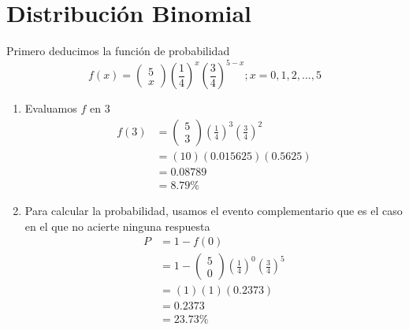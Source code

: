 \documentclass[12pt, letterpaper]{article}
\begin{document}
\section{Distribución Binomial}
Primero deducimos la función de probabilidad
\begin{equation*}
    f(x) = 
    \left(
        \begin{matrix}
            5 \\
            x
        \end{matrix}
    \right)
    \left(\frac{1}{4}\right)^{x}\left(\frac{3}{4}\right)^{5-x};x=0, 1, 2, ..., 5
\end{equation*}
\begin{enumerate}
    \item Evaluamos $f$ en 3
    \begin{equation*}
        \begin{aligned}
            f(3)
            & = 
            \left(
                \begin{matrix}
                    5 \\
                    3
                \end{matrix}
            \right)
            \left(\frac{1}{4}\right)^{3}\left(\frac{3}{4}\right)^{2} \\
            & = (10)(0.015625)(0.5625) \\
            & = 0.08789 \\
            & = 8.79\%
        \end{aligned}
    \end{equation*}
    \item Para calcular la probabilidad, usamos el evento complementario que es el caso en el que no acierte ninguna respuesta
    \begin{equation*}
        \begin{aligned}
            P
            & = 1 - f(0) \\
            & = 1 - 
            \left(
                \begin{matrix}
                    5 \\
                    0
                \end{matrix}
            \right)
            \left(\frac{1}{4}\right)^{0}\left(\frac{3}{4}\right)^{5} \\
            & = (1)(1)(0.2373) \\
            & = 0.2373 \\
            & = 23.73\%
        \end{aligned}
    \end{equation*}
\end{enumerate}
\end{document}
